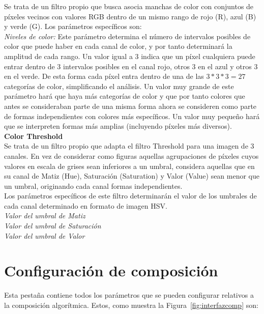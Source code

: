 		Se trata de un filtro propio que busca asocia manchas de color con conjuntos de píxeles vecinos con valores RGB dentro de un mismo rango de rojo (R), azul (B) y verde (G). Los parámetros específicos son:\\
		
		\noindent\textit{Niveles de color:} Este parámetro determina el número de intervalos posibles de color que puede haber en cada canal de color, y por tanto determinará la amplitud de cada rango. Un valor igual a 3 indica que un píxel cualquiera puede entrar dentro de 3 intervalos posibles en el canal rojo, otros 3 en el azul y otros 3 en el verde. De esta forma cada píxel entra dentro de una de las $3*3*3=27$ categorías de color, simplificando el análisis. Un valor muy grande de este parámetro hará que haya más categorías de color y que por tanto colores que antes se consideraban parte de una misma forma ahora se consideren como parte de formas independientes con colores más específicos. Un valor muy pequeño hará que se interpreten formas más amplias (incluyendo píxeles más diversos).\\
		
	\noindent\textbf{Color Threshold}\\

		Se trata de un filtro propio que adapta el filtro Threshold para una imagen de 3 canales. En vez de considerar como figuras aquellas agrupaciones de píxeles cuyos valores en escala de grises sean inferiores a un umbral, considera aquellas que en su canal de Matiz (Hue), Saturación (Saturation) y Valor (Value) sean menor que un umbral, originando cada canal formas independientes.\\
		
		Los parámetros específicos de este filtro determinarán el valor de los umbrales de cada canal determinado en formato de imagen HSV.\\		
		
		\noindent\textit{Valor del umbral de Matiz}\\
		\noindent\textit{Valor del umbral de Saturación}\\
		\noindent\textit{Valor del umbral de Valor}




		
		\section{Configuración de composición}
		
		Esta pestaña contiene todos los parámetros que se pueden configurar relativos a la composición algorítmica. Estos, como muestra la Figura~\ref{fig:interfazcomp} son:\\
		
